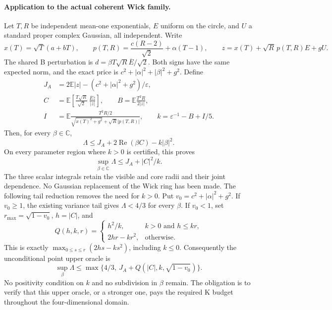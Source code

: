 \paragraph{Application to the actual coherent Wick family.}
Let $T,R$ be independent mean-one exponentials, $E$ uniform on the circle, and $U$ a standard proper complex Gaussian, all independent. Write
\[
x(T)=\sqrt T(a+bT),\qquad
p(T,R)=\frac{c(R-2)}{\sqrt2}+\alpha(T-1),\qquad
z=x(T)+\sqrt R\,p(T,R)E+gU.
\]
The shared B perturbation is $d=\beta T\sqrt R\overline E/\sqrt2$. Both signs have the same expected norm, and the exact price is $c^2+|\alpha|^2+|\beta|^2+g^2$. Define
\begin{align*}
J_A&=2\mathbb E|z|-(c^2+|\alpha|^2+g^2)/\varepsilon,\\
C&=\mathbb E\left[\frac{T\sqrt R}{\sqrt2}\,
          \frac{\overline E\overline z}{|z|}\right],\qquad
B=\mathbb E\frac{T^2R}{2|z|},\\
I&=\mathbb E\frac{T^2R/2}
 {\sqrt{x(T)^2+g^2}+\sqrt R|p(T,R)|},\qquad
k=\varepsilon^{-1}-B+I/5.
\end{align*}
Then, for every $\beta\in\mathbb C$,
\[
\boxed{\quad\Lambda\le J_A+2\operatorname{Re}(\beta C)-k|\beta|^2.\quad}
\]
On every parameter region where $k>0$ is certified, this proves
\[
\boxed{\quad\sup_{\beta\in\mathbb C}\Lambda\le J_A+|C|^2/k.\quad}
\]
The three scalar integrals retain the visible and core radii and their joint dependence. No Gaussian replacement of the Wick ring has been made. The following tail reduction removes the need for $k>0$. Put $v_0=c^2+|\alpha|^2+g^2$. If $v_0\ge1$, the existing variance tail gives $\Lambda<4/3$ for every $\beta$. If $v_0<1$, set $r_{\max}=\sqrt{1-v_0}$, $h=|C|$, and
\[
Q(h,k,r)=\begin{cases}
h^2/k,&k>0\text{ and }h\le kr,\\
2hr-kr^2,&\text{otherwise}.
\end{cases}
\]
This is exactly $\max_{0\le s\le r}(2hs-ks^2)$, including $k\le0$. Consequently the unconditional point upper oracle is
\[
\boxed{\quad\sup_\beta\Lambda\le
\max\{4/3,\ J_A+Q(|C|,k,\sqrt{1-v_0})\}.\quad}
\]
No positivity condition on $k$ and no subdivision in $\beta$ remain. The obligation is to verify that this upper oracle, or a stronger one, pays the required K budget throughout the four-dimensional domain.


